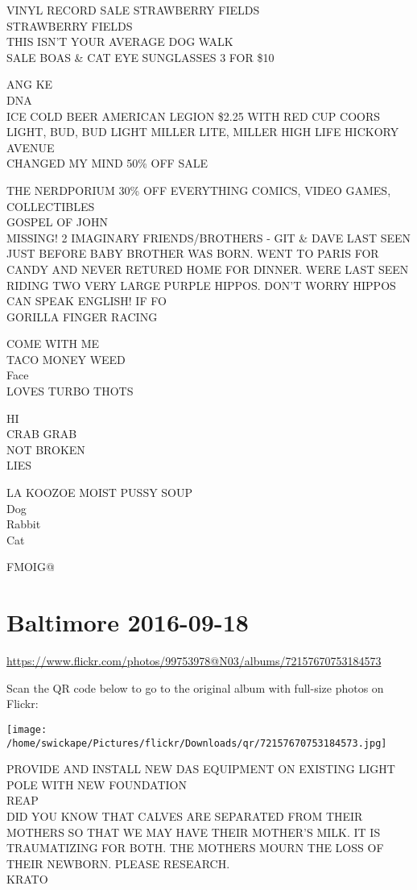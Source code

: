 \documentclass[10pt,letterpaper]{article}
\begin{document}
VINYL RECORD SALE STRAWBERRY FIELDS\\
STRAWBERRY FIELDS\\
THIS ISN'T YOUR AVERAGE DOG WALK\\
SALE BOAS \& CAT EYE SUNGLASSES 3 FOR \$10

ANG KE\\
DNA\\
ICE COLD BEER AMERICAN LEGION \$2.25 WITH RED CUP COORS LIGHT, BUD, BUD LIGHT MILLER LITE, MILLER HIGH LIFE HICKORY AVENUE\\
CHANGED MY MIND 50\% OFF SALE

THE NERDPORIUM 30\% OFF EVERYTHING COMICS, VIDEO GAMES, COLLECTIBLES\\
GOSPEL OF JOHN\\
MISSING!  2 IMAGINARY FRIENDS/BROTHERS {-} GIT \& DAVE LAST SEEN JUST BEFORE BABY BROTHER WAS BORN.  WENT TO PARIS FOR CANDY AND NEVER RETURED HOME FOR DINNER.  WERE LAST SEEN RIDING TWO VERY LARGE PURPLE HIPPOS.  DON'T WORRY HIPPOS CAN SPEAK ENGLISH!  IF FO\\
GORILLA FINGER RACING

COME WITH ME\\
TACO MONEY WEED\\
Face\\
LOVES TURBO THOTS

HI\\
CRAB GRAB\\
NOT BROKEN\\
LIES

LA KOOZOE MOIST PUSSY SOUP\\
Dog\\
Rabbit\\
Cat

FMOIG@


\section*{Baltimore 2016-09-18}

\url{https://www.flickr.com/photos/99753978@N03/albums/72157670753184573}

Scan the QR code below to go to the original album with full-size photos on Flickr:

\texttt{[image: /home/swickape/Pictures/flickr/Downloads/qr/72157670753184573.jpg]}


PROVIDE AND INSTALL NEW DAS EQUIPMENT ON EXISTING LIGHT POLE WITH NEW FOUNDATION\\
REAP\\
DID YOU KNOW THAT CALVES ARE SEPARATED FROM THEIR MOTHERS SO THAT WE MAY HAVE THEIR MOTHER'S MILK.  IT IS TRAUMATIZING FOR BOTH.  THE MOTHERS MOURN THE LOSS OF THEIR NEWBORN.  PLEASE RESEARCH.\\
KRATO
\end{document}
